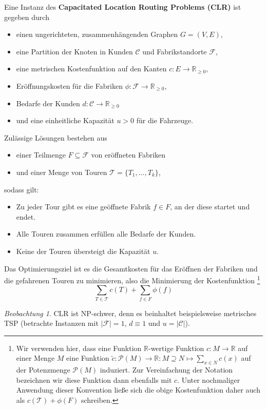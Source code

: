 \documentclass[a4paper,ngerman,12pt,bibtotoc]{scrartcl}
\theoremstyle{definition}
\theoremstyle{plain}
\theoremstyle{remark}
\newtheorem{beob}[defn]{Beobachtung}
\newcommand{\IR}{\mathbb{R}}
\newcommand{\Tc}{\mathcal{T}}
\newcommand{\ClientSet}{\mathscr{C}}
\newcommand{\FacilitySet}{\mathscr{F}}
\newcommand{\CLR}{\mathrm{CLR}}
\begin{document}
Eine Instanz des \textbf{Capacitated Location Routing Problems (CLR)} ist gegeben durch
\begin{itemize}
	\item einen ungerichteten, zusammenhängenden Graphen $G =(V,E)$,
	\item eine Partition der Knoten in Kunden $\ClientSet$ und Fabrikstandorte $\FacilitySet$,
	\item eine metrischen Kostenfunktion auf den Kanten $c: E \to \IR_{\geq 0}$,
	\item Eröffnungskosten für die Fabriken $\phi: \FacilitySet \to \IR_{\geq 0}$,
	\item Bedarfe der Kunden $d: \ClientSet \to \IR_{\geq 0}$
	\item und eine einheitliche Kapazität $u > 0$ für die Fahrzeuge.		
\end{itemize}
Zulässige Lösungen bestehen aus
\begin{itemize}
	\item einer Teilmenge $F \subseteq \FacilitySet$ von eröffneten Fabriken
	\item und einer Menge von Touren $\Tc = \{T_1, \dots, T_k\}$,
\end{itemize}
sodass gilt:
\begin{itemize}
	\item Zu jeder Tour gibt es eine geöffnete Fabrik $f \in F$, an der diese startet und endet.
	\item Alle Touren zusammen erfüllen alle Bedarfe der Kunden.
	\item Keine der Touren übersteigt die Kapazität $u$.
\end{itemize}
Das Optimierungsziel ist es die Gesamtkosten für das Eröffnen der Fabriken und die gefahrenen Touren zu minimieren, also die Minimierung der Kostenfunktion
\footnote{Wir verwenden hier, dass eine Funktion $\IR$-wertige Funktion $c: M \to \IR$ auf einer Menge $M$ eine Funktion $\tilde{c}: \mathcal{P}(M) \to \IR: M \supseteq N \mapsto \sum_{x \in N} c(x)$ auf der Potenzmenge $\mathcal{P}(M)$ induziert. Zur Vereinfachung der Notation bezeichnen wir diese Funktion dann ebenfalls mit $c$. Unter nochmaliger Anwendung dieser Konvention ließe sich die obige Kostenfunktion daher auch als $c(\Tc) + \phi(F)$ schreiben.}
	\[\sum_{T\in\Tc} c(T) + \sum_{f\in F}\phi(f) \]
	
\begin{beob}
	$\CLR{}$ ist NP-schwer, denn es beinhaltet beispielsweise metrisches TSP (betrachte Instanzen mit $|\FacilitySet| = 1$, $d \equiv 1$ und $u = |\ClientSet|$).
\end{beob}
\end{document}
